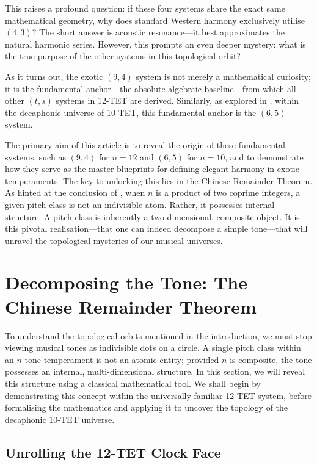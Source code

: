 \documentclass[11pt,letterpaper]{amsart}
\begin{document}
This raises a profound question: if these four systems share the exact same mathematical geometry, why does standard Western harmony exclusively utilise $(4,3)$? The short answer is acoustic resonance---it best approximates the natural harmonic series. However, this prompts an even deeper mystery: what is the true purpose of the other systems in this topological orbit? 

As it turns out, the exotic $(9,4)$ system is not merely a mathematical curiosity; it is the fundamental anchor---the absolute algebraic baseline---from which all other $(t,s)$ systems in 12-TET are derived. Similarly, as explored in \cite{nur2}, within the decaphonic universe of 10-TET, this fundamental anchor is the $(6,5)$ system. 

The primary aim of this article is to reveal the origin of these fundamental systems, such as $(9,4)$ for $n=12$ and $(6,5)$ for $n=10$, and to demonstrate how they serve as the master blueprints for defining elegant harmony in exotic temperaments. The key to unlocking this lies in the Chinese Remainder Theorem. As hinted at the conclusion of \cite{nur1}, when $n$ is a product of two coprime integers, a given pitch class is not an indivisible atom. Rather, it possesses internal structure. A pitch class is inherently a two-dimensional, composite object. It is this pivotal realisation---that one can indeed decompose a simple tone---that will unravel the topological mysteries of our musical universes.


\section{Decomposing the Tone: The Chinese Remainder Theorem}
\label{sec:crt}

To understand the topological orbits mentioned in the introduction, we must stop viewing musical tones as indivisible dots on a circle. A single pitch class within an $n$-tone temperament is not an atomic entity; provided $n$ is composite, the tone possesses an internal, multi-dimensional structure. In this section, we will reveal this structure using a classical mathematical tool. We shall begin by demonstrating this concept within the universally familiar 12-TET system, before formalising the mathematics and applying it to uncover the topology of the decaphonic 10-TET universe.

\subsection{Unrolling the 12-TET Clock Face}
\end{document}
